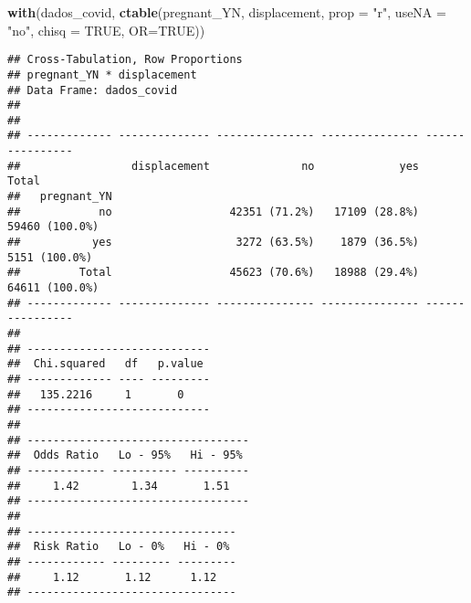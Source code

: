 \documentclass[
]{article}
\newenvironment{Shaded}{\begin{snugshade}}{\end{snugshade}}
\newcommand{\CommentTok}[1]{\textcolor[rgb]{0.56,0.35,0.01}{\textit{#1}}}
\newcommand{\DataTypeTok}[1]{\textcolor[rgb]{0.13,0.29,0.53}{#1}}
\newcommand{\KeywordTok}[1]{\textcolor[rgb]{0.13,0.29,0.53}{\textbf{#1}}}
\newcommand{\NormalTok}[1]{#1}
\newcommand{\OperatorTok}[1]{\textcolor[rgb]{0.81,0.36,0.00}{\textbf{#1}}}
\newcommand{\OtherTok}[1]{\textcolor[rgb]{0.56,0.35,0.01}{#1}}
\newcommand{\StringTok}[1]{\textcolor[rgb]{0.31,0.60,0.02}{#1}}
\begin{document}
\begin{Shaded}
\end{Shaded}

\begin{Shaded}
\begin{Highlighting}[]
\KeywordTok{with}\NormalTok{(dados_covid, }\KeywordTok{ctable}\NormalTok{(pregnant_YN, displacement, }\DataTypeTok{prop =} \StringTok{"r"}\NormalTok{, }\DataTypeTok{useNA =} \StringTok{"no"}\NormalTok{, }\DataTypeTok{chisq =} \OtherTok{TRUE}\NormalTok{, }\DataTypeTok{OR=}\OtherTok{TRUE}\NormalTok{))}
\end{Highlighting}
\end{Shaded}

\begin{verbatim}
## Cross-Tabulation, Row Proportions  
## pregnant_YN * displacement  
## Data Frame: dados_covid  
## 
## 
## ------------- -------------- --------------- --------------- ----------------
##                 displacement              no             yes            Total
##   pregnant_YN                                                                
##            no                  42351 (71.2%)   17109 (28.8%)   59460 (100.0%)
##           yes                   3272 (63.5%)    1879 (36.5%)    5151 (100.0%)
##         Total                  45623 (70.6%)   18988 (29.4%)   64611 (100.0%)
## ------------- -------------- --------------- --------------- ----------------
## 
## ----------------------------
##  Chi.squared   df   p.value 
## ------------- ---- ---------
##   135.2216     1       0    
## ----------------------------
## 
## ----------------------------------
##  Odds Ratio   Lo - 95%   Hi - 95% 
## ------------ ---------- ----------
##     1.42        1.34       1.51   
## ----------------------------------
## 
## --------------------------------
##  Risk Ratio   Lo - 0%   Hi - 0% 
## ------------ --------- ---------
##     1.12       1.12      1.12   
## --------------------------------
\end{verbatim}
\end{document}
